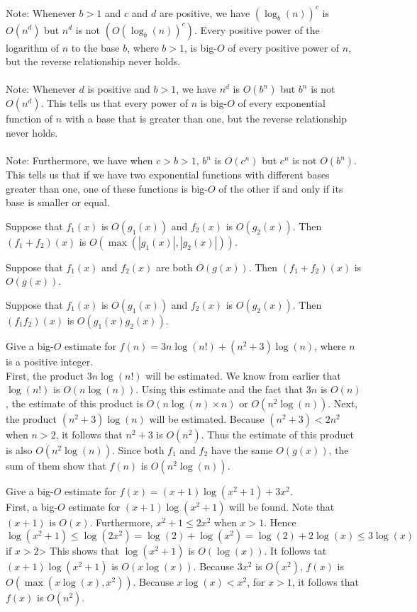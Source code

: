 \documentclass[12pt]{article}
\begin{document}
Note: Whenever $b > 1$ and $c$ and $d$ are positive, we have $(\log_b(n))^c$ is $O(n^d)$ but $n^d$ is not $(O(\log_b(n))^c)$. Every positive power of the logarithm of $n$ to the base $b$, where $b > 1$, is big-$O$ of every positive power of $n$, but the reverse relationship never holds. \\~\\ 
Note: Whenever $d$ is positive and $b > 1$, we have $n^d$ is $O(b^n)$ but $b^n$ is not $O(n^d)$. This tells us that every power of $n$ is big-$O$ of every exponential function of $n$ with a base that is greater than one, but the reverse relationship never holds. \\~\\ 
Note: Furthermore, we have when $c > b > 1$, $b^n$ is $O(c^n)$ but $c^n$ is not $O(b^n)$. This tells us that if we have two exponential functions with different bases greater than one, one of these functions is big-$O$ of the other if and only if its base is smaller or equal. 
\begin{theorem} Suppose that $f_1(x)$ is $O(g_1(x))$ and $f_2(x)$ is $O(g_2(x))$. Then $(f_1 + f_2)(x)$ is $O(\max(|g_1(x)|, |g_2(x)|))$. \end{theorem}
\begin{theorem} Suppose that $f_1(x)$ and $f_2(x)$ are both $O(g(x))$. Then $(f_1 + f_2)(x)$ is $O(g(x))$. \end{theorem} 
\begin{theorem} Suppose that $f_1(x)$ is $O(g_1(x))$ and $f_2(x)$ is $O(g_2(x))$. Then $(f_1f_2)(x)$ is $O(g_1(x)g_2(x))$. \end{theorem} 
\begin{example} Give a big-$O$ estimate for $f(n) = 3n\log(n!) + (n^2 + 3)\log(n)$, where $n$ is a positive integer. \\ First, the product $3n\log(n!)$ will be estimated. We know from earlier that $\log(n!)$ is $O(n\log(n))$. Using this estimate and the fact that $3n$ is $O(n)$, the estimate of this product is $O(n\log(n) \times n)$ or $O(n^2\log(n))$. Next, the product $(n^2 + 3)\log(n)$ will be estimated. Because $(n^2 + 3) < 2n^2$ when $n > 2$, it follows that $n^2 + 3$ is $O(n^2)$. Thus the estimate of this product is also $O(n^2\log(n))$. Since both $f_1$ and $f_2$ have the same $O(g(x))$, the sum of them show that $f(n)$ is $O(n^2\log(n))$. \end{example} 
\begin{example} Give a big-$O$ estimate for $f(x) = (x + 1)\log(x^2 + 1) + 3x^2$. \\ First, a big-$O$ estimate for $(x + 1)\log(x^2 + 1)$ will be found. Note that $(x + 1)$ is $O(x)$. Furthermore, $x^2 + 1 \leq 2x^2$ when $x > 1$. Hence $$ \log(x^2 + 1) \leq \log(2x^2) = \log(2) + \log(x^2) = \log(2) + 2\log(x) \leq 3\log(x) $$ if $x > 2$> This shows that $\log(x^2 + 1)$ is $O(\log(x))$. It follows tat $(x + 1)\log(x^2 + 1)$ is $O(x\log(x))$. Because $3x^2$ is $O(x^2)$, $f(x)$ is $O(\max(x\log(x), x^2))$. Because $x\log(x) < x^2$, for $x > 1$, it follows that $f(x)$ is $O(n^2)$. \end{example} 
\end{document}
